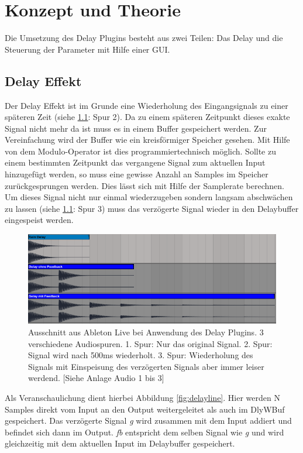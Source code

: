 \chapter{Konzept und Theorie}

Die Umsetzung des Delay Plugins besteht aus zwei Teilen: Das Delay und die Steuerung der Parameter mit Hilfe einer GUI.

\section{Delay Effekt}

Der Delay Effekt ist im Grunde eine Wiederholung des Eingangsignals zu einer späteren Zeit (siehe \ref{fig:ableton}: Spur 2). Da zu einem späteren Zeitpunkt dieses exakte Signal nicht mehr da ist muss es in einem Buffer gespeichert werden. Zur Vereinfachung wird der Buffer wie ein kreisförmiger Speicher gesehen. Mit Hilfe von dem Modulo-Operator ist dies programmiertechnisch möglich.
Sollte zu einem bestimmten Zeitpunkt das vergangene Signal zum aktuellen Input hinzugefügt werden, so muss eine gewisse Anzahl an Samples im Speicher zurückgesprungen werden. Dies lässt sich mit Hilfe der Samplerate berechnen.
Um dieses Signal nicht nur einmal wiederzugeben sondern langsam abschwächen zu lassen (siehe \ref{fig:ableton}: Spur 3) muss das verzögerte Signal wieder in den Delaybuffer eingespeist werden.

\begin{figure}
	\centering
	\includegraphics[width=0.8\linewidth]{images/ableton}
	\caption{Ausschnitt aus Ableton Live bei Anwendung des Delay Plugins. 3 verschiedene Audiospuren. 1. Spur: Nur das original Signal. 2. Spur: Signal wird nach 500ms wiederholt. 3. Spur: Wiederholung des Signals mit Einspeisung des verzögerten Signals aber immer leiser werdend. [Siehe Anlage Audio 1 bis 3]}
	\label{fig:ableton}
\end{figure}

Als Veranschaulichung dient hierbei Abbildung \ref{fig:delayline}. Hier werden N Samples direkt vom Input an den Output weitergeleitet als auch im DlyWBuf gespeichert. Das verzögerte Signal \textit{g} wird zusammen mit dem Input addiert und befindet sich dann im Output. \textit{fb} entspricht dem selben Signal wie \textit{g} und wird gleichzeitig mit dem aktuellen Input im Delaybuffer gespeichert.

